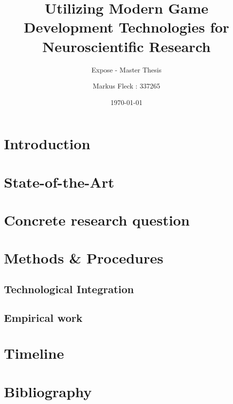 \documentclass[	DIV=calc, paper=a4,	fontsize=11pt, twocolumn]{scrartcl}
\title{Utilizing Modern Game Development Technologies for Neuroscientific Research}					%
\subtitle{Expose - Master Thesis}
\author{Markus Fleck : 337265}
\date{\today}
\begin{document}
\maketitle

\begin{abstract}
\end{abstract}

\section*{Introduction}

\section*{State-of-the-Art}



\section*{Concrete research question}

\section*{Methods \& Procedures}

\subsection*{Technological Integration}

\subsection*{Empirical work}

\section*{Timeline}

\section*{Bibliography}
\end{document}
